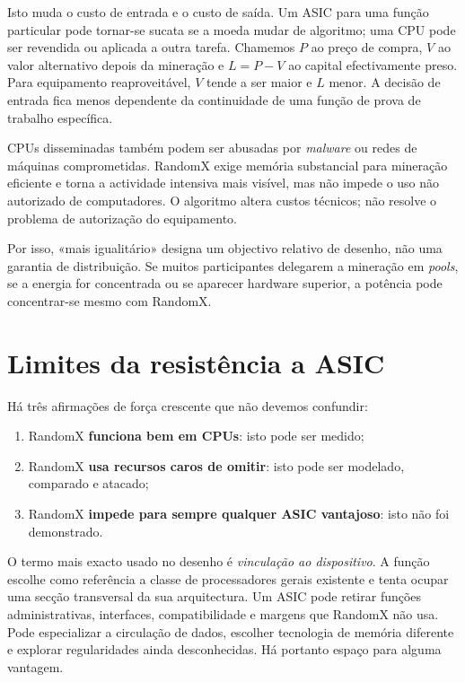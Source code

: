 Isto muda o custo de entrada e o custo de saída. Um ASIC para uma função
particular pode tornar-se sucata se a moeda mudar de algoritmo; uma CPU pode
ser revendida ou aplicada a outra tarefa. Chamemos \(P\) ao preço de compra,
\(V\) ao valor alternativo depois da mineração e \(L=P-V\) ao capital
efectivamente preso. Para equipamento reaproveitável, \(V\) tende a ser maior
e \(L\) menor. A decisão de entrada fica menos dependente da continuidade de
uma função de prova de trabalho específica.

CPUs disseminadas também podem ser abusadas por \emph{malware} ou redes de
máquinas comprometidas. RandomX exige memória substancial para mineração
eficiente e torna a actividade intensiva mais visível, mas não impede o uso
não autorizado de computadores. O algoritmo altera custos técnicos; não
resolve o problema de autorização do equipamento.

Por isso, «mais igualitário» designa um objectivo relativo de desenho, não uma
garantia de distribuição. Se muitos participantes delegarem a mineração em
\emph{pools}, se a energia for concentrada ou se aparecer hardware superior, a
potência pode concentrar-se mesmo com RandomX.


\section{Limites da resistência a ASIC}
\label{sec:randomx-asic-resistance}

Há três afirmações de força crescente que não devemos confundir:
\begin{enumerate}
 \item RandomX \textbf{funciona bem em CPUs}: isto pode ser medido;
 \item RandomX \textbf{usa recursos caros de omitir}: isto pode ser modelado,
 comparado e atacado;
 \item RandomX \textbf{impede para sempre qualquer ASIC vantajoso}: isto não
 foi demonstrado.
\end{enumerate}

O termo mais exacto usado no desenho é \emph{vinculação ao dispositivo}. A
função escolhe como referência a classe de processadores gerais existente e
tenta ocupar uma secção transversal da sua arquitectura. Um ASIC pode retirar
funções administrativas, interfaces, compatibilidade e margens que RandomX
não usa. Pode especializar a circulação de dados, escolher tecnologia de
memória diferente e explorar regularidades ainda desconhecidas. Há portanto
espaço para alguma vantagem.

